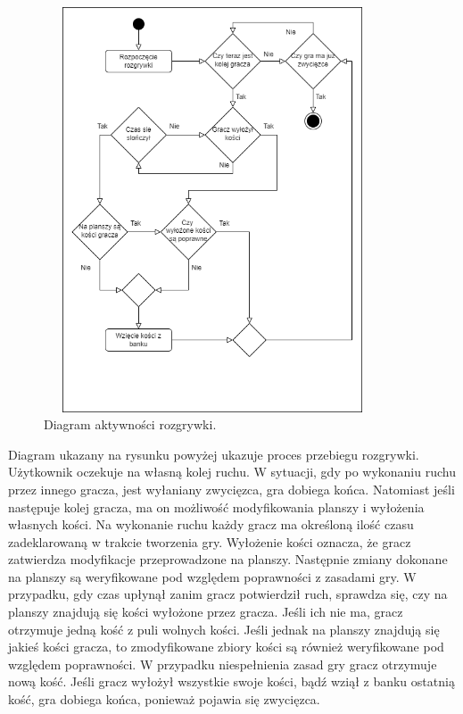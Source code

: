 \begin{figure}[h!]
	\begin{center}
		\includegraphics[width=10cm,height=12cm]{img/activity-diagram-game.png}
	\end{center}
	\caption{{\color{dgray} Diagram aktywności rozgrywki.}} 
	\label{diagram-aktywnosci-game}
\end{figure}  

Diagram ukazany na rysunku powyżej ukazuje proces przebiegu rozgrywki. Użytkownik oczekuje na własną kolej ruchu. W sytuacji, gdy po wykonaniu ruchu przez innego gracza, jest wyłaniany zwycięzca, gra dobiega końca. Natomiast jeśli następuje kolej gracza, ma on możliwość modyfikowania planszy i 
wyłożenia własnych kości. Na wykonanie ruchu każdy gracz ma określoną ilość czasu zadeklarowaną w trakcie tworzenia gry. Wyłożenie kości oznacza, że gracz zatwierdza modyfikacje przeprowadzone na planszy. Następnie zmiany dokonane na planszy są weryfikowane pod względem poprawności z zasadami gry. W przypadku, gdy czas upłynął zanim gracz potwierdził ruch, sprawdza się, czy na planszy znajdują się kości wyłożone przez gracza. Jeśli ich nie ma, gracz otrzymuje jedną kość z puli wolnych kości. Jeśli jednak na planszy znajdują się jakieś kości gracza, to zmodyfikowane zbiory kości są również weryfikowane pod względem poprawności. W przypadku niespełnienia zasad gry gracz otrzymuje nową kość. 
Jeśli gracz wyłożył wszystkie swoje kości, bądź wziął z banku ostatnią kość, %
gra dobiega końca, ponieważ pojawia się zwycięzca.


